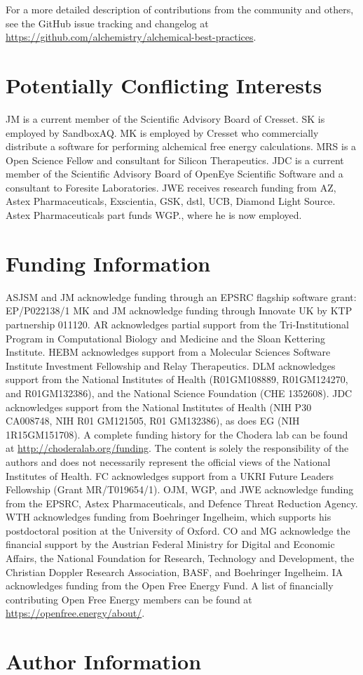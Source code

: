\documentclass[9pt,bestpractices]{livecoms}
\newcommand{\githubrepository}{\url{https://github.com/alchemistry/alchemical-best-practices}} %
\begin{document}
For a more detailed description of contributions from the community and others, 
see the GitHub issue tracking and changelog at \githubrepository.


\section*{Potentially Conflicting Interests}
JM is a current member of the Scientific Advisory Board of Cresset. 
SK is employed by SandboxAQ.
MK is employed by Cresset who commercially distribute a software for performing alchemical free energy calculations. MRS is a Open Science Fellow and consultant for Silicon Therapeutics.
JDC is a current member of the Scientific Advisory Board of OpenEye Scientific Software and a consultant to Foresite Laboratories.
JWE receives research funding from AZ, Astex Pharmaceuticals, Exscientia, GSK, dstl, UCB, Diamond Light Source. Astex Pharmaceuticals part funds WGP., where he is now employed.
\section*{Funding Information}
ASJSM and JM acknowledge funding through an EPSRC flagship software grant: EP/P022138/1
MK and JM acknowledge funding through Innovate UK by KTP partnership 011120.
AR acknowledges partial support from the Tri-Institutional Program in Computational Biology and Medicine and the Sloan Kettering Institute.
HEBM acknowledges support from a Molecular Sciences Software Institute Investment Fellowship and Relay Therapeutics.
DLM acknowledges support from the National Institutes of Health (R01GM108889, R01GM124270, and R01GM132386), and the National Science Foundation (CHE 1352608).
JDC acknowledges support from the National Institutes of Health (NIH P30 CA008748, NIH R01 GM121505, R01 GM132386), as does EG (NIH 1R15GM151708).
A complete funding history for the Chodera lab can be found at \url{http://choderalab.org/funding}.
The content is solely the responsibility of the authors and does not necessarily represent the official views of the National Institutes of Health.
FC acknowledges support from a UKRI Future Leaders Fellowship (Grant MR/T019654/1).
OJM, WGP, and JWE acknowledge funding from the EPSRC, Astex Pharmaceuticals, and Defence Threat Reduction Agency.
WTH acknowledges funding from Boehringer Ingelheim, which supports his postdoctoral position at the University of Oxford.
CO and MG acknowledge the financial support by the Austrian Federal Ministry for Digital and Economic Affairs, the National Foundation for Research, Technology and Development, the Christian Doppler Research Association, BASF, and Boehringer Ingelheim.
IA acknowledges funding from the Open Free Energy Fund. A list of financially contributing Open Free Energy members can be found at \url{https://openfree.energy/about/}.


\section*{Author Information}
\makeorcid



\end{document}
